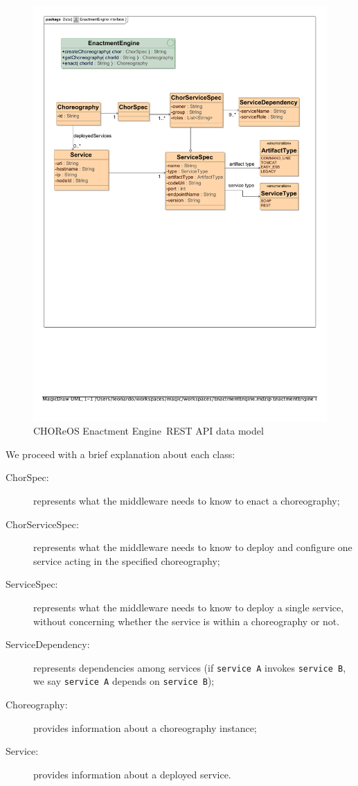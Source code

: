 \documentclass[a4paper, 10pt]{article}
\newcommand{\ee}{CHOReOS Enactment Engine}
\begin{document}
\begin{figure}
\centering
\includegraphics[scale=0.75]{img/data_model.pdf}
\caption{\ee\ REST API data model}
\label{img:data_model}
\end{figure}

We proceed with a brief explanation about each class:

\begin{description}
\item [ChorSpec:] represents what the middleware needs to know to enact a choreography;
\item [ChorServiceSpec:] represents what the middleware needs to know to deploy and configure one service acting in the specified choreography;
\item [ServiceSpec:] represents what the middleware needs to know to deploy a single service, without concerning whether the service is within a choreography or not. 
\item [ServiceDependency:] represents dependencies among services (if \verb!service A! invokes \verb!service B!, we say \verb!service A! depends on \verb!service B!);
\item [Choreography:] provides information about a choreography instance; 
\item [Service:] provides information about a deployed service. 
\end{description}
\end{document}
